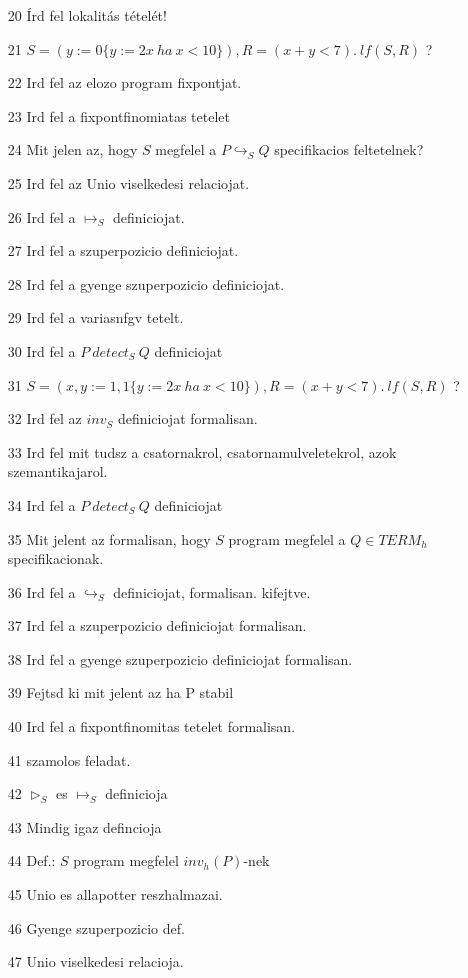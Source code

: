 \documentclass{article}
\begin{document}
\begin{enumerate}
\item[20] Írd fel lokalitás tételét!
\item[21] $S = (y:=0 \{y:=2x\ ha\  x < 10 \}), R = (x+y<7).\ lf(S,R)$ ?
\item[22] Ird fel az elozo program fixpontjat.
\item[23] Ird fel a fixpontfinomiatas tetelet
\item[24] Mit jelen az, hogy $S$ megfelel a $P \hookrightarrow_S Q$ specifikacios feltetelnek?
\item[25] Ird fel az Unio viselkedesi relaciojat.
\item[26] Ird fel a $\mapsto_S$ definiciojat.
\item[27] Ird fel a szuperpozicio definiciojat.
\item[28] Ird fel a gyenge szuperpozicio definiciojat.
\item[29] Ird fel a variasnfgv tetelt.
\item[30] Ird fel a $P\ detect_S\ Q$ definiciojat
\item[31] $S = (x, y:=1,1 \{y:=2x\ ha\  x < 10 \}), R = (x+y<7).\ lf(S,R)$ ?
\item[32] Ird fel az $inv_S$ definiciojat formalisan.
\item[33] Ird fel mit tudsz a csatornakrol, csatornamulveletekrol, azok szemantikajarol.
\item[34] Ird fel a $P\ detect_S\ Q$ definiciojat
\item[35] Mit jelent az formalisan, hogy $S$ program megfelel a $Q \in TERM_h$ specifikacionak.
\item[36] Ird fel a $\hookrightarrow_S$ definiciojat, formalisan. kifejtve.
\item[37] Ird fel a szuperpozicio definiciojat formalisan.
\item[38] Ird fel a gyenge szuperpozicio definiciojat formalisan.
\item[39] Fejtsd ki mit jelent az ha P stabil
\item[40] Ird fel a fixpontfinomitas tetelet formalisan.
\item[41] szamolos feladat.
\item[42] $\triangleright_S$ es $\mapsto_S$ definicioja
\item[43] Mindig igaz defincioja
\item[44] Def.: $S$ program megfelel $inv_h(P)$-nek
\item[45] Unio es allapotter reszhalmazai.
\item[46] Gyenge szuperpozicio def.
\item[47] Unio viselkedesi relacioja.

\end{enumerate}
\end{document}
